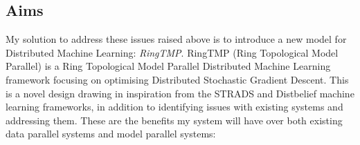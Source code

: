 \subsection{Aims}
My solution to address these issues raised above is to introduce a new model for
Distributed Machine Learning: \textit{RingTMP}. RingTMP (Ring Topological Model
Parallel) is a Ring Topological Model Parallel Distributed Machine Learning
framework focusing on optimising Distributed Stochastic Gradient Descent. This
is a novel design drawing in inspiration from the STRADS and Distbelief machine
learning frameworks, \cite{kim2016STRADS,Dean2012Distbelief} in addition to
identifying issues with existing systems and addressing them. These are the
benefits my system will have over both existing data parallel systems and model parallel
systems:
\begin{itemize}


\end{itemize}

